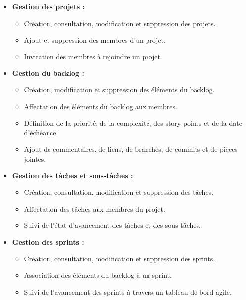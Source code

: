 \begin{itemize}
  \item[$\bullet$] \textbf{Gestion des projets :}
        \begin{itemize}
          \item[$\circ$] Création, consultation, modification et suppression des projets.
          \item[$\circ$] Ajout et suppression des membres d'un projet.
          \item[$\circ$] Invitation des membres à rejoindre un projet.
        \end{itemize}

  \item[$\bullet$] \textbf{Gestion du backlog :}
        \begin{itemize}
          \item[$\circ$] Création, modification et suppression des éléments du backlog.
          \item[$\circ$] Affectation des éléments du backlog aux membres.
          \item[$\circ$] Définition de la priorité, de la complexité, des story points et de la date d'échéance.
          \item[$\circ$] Ajout de commentaires, de liens, de branches, de commits et de pièces jointes.
        \end{itemize}

  \item[$\bullet$] \textbf{Gestion des tâches et sous-tâches :}
        \begin{itemize}
          \item[$\circ$] Création, consultation, modification et suppression des tâches.
          \item[$\circ$] Affectation des tâches aux membres du projet.
          \item[$\circ$] Suivi de l'état d'avancement des tâches et des sous-tâches.
        \end{itemize}

  \item[$\bullet$] \textbf{Gestion des sprints :}
        \begin{itemize}
          \item[$\circ$] Création, consultation, modification et suppression des sprints.
          \item[$\circ$] Association des éléments du backlog à un sprint.
          \item[$\circ$] Suivi de l'avancement des sprints à travers un tableau de bord agile.
        \end{itemize}


\end{itemize}
